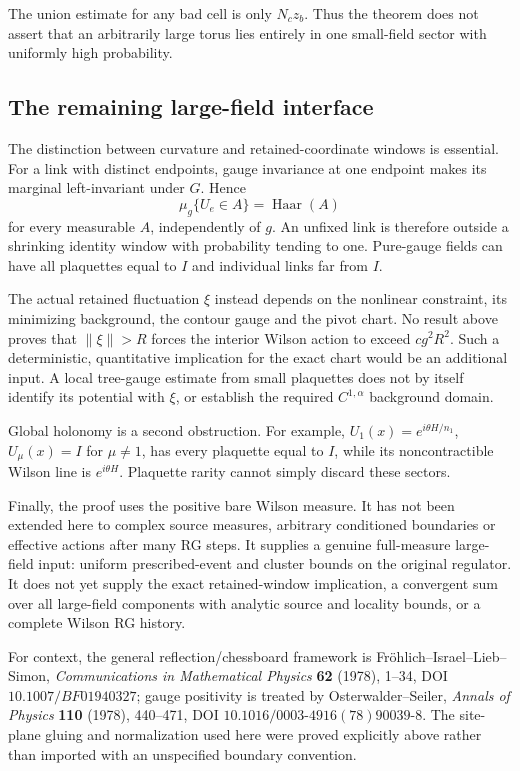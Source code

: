 \documentclass[11pt]{article}
\theoremstyle{remark}
\begin{document}
The union estimate for any bad cell is only \(N_c z_b\).
Thus the theorem does not assert that an arbitrarily large torus lies
entirely in one small-field sector with uniformly high probability.

\subsection{The remaining large-field interface}
\label{fwp-scope}

The distinction between curvature and retained-coordinate windows is
essential. For a link with distinct endpoints, gauge invariance at one
endpoint makes its marginal left-invariant under \(G\). Hence
\begin{equation}
 \mu_g\{U_e\in A\}=\operatorname{Haar}(A)
 \label{fwp-haar-marginal}
\end{equation}
for every measurable \(A\), independently of \(g\).
An unfixed link is therefore outside a shrinking identity window with
probability tending to one. Pure-gauge fields can have all plaquettes
equal to \(I\) and individual links far from \(I\).

The actual retained fluctuation \(\xi\) instead depends on the nonlinear
constraint, its minimizing background, the contour gauge and the pivot
chart. No result above proves that \(\|\xi\|>R\) forces the interior
Wilson action to exceed \(c g^2R^2\). Such a deterministic, quantitative
implication for the exact chart would be an additional input.
A local tree-gauge estimate from small plaquettes does not by itself
identify its potential with \(\xi\), or establish the required
\(C^{1,\alpha}\) background domain.

Global holonomy is a second obstruction. For example,
\(U_1(x)=e^{i\theta H/n_1}\), \(U_\mu(x)=I\) for \(\mu\ne1\),
has every plaquette equal to \(I\), while its noncontractible Wilson
line is \(e^{i\theta H}\). Plaquette rarity cannot simply discard these
sectors.

Finally, the proof uses the positive bare Wilson measure. It has not
been extended here to complex source measures, arbitrary conditioned
boundaries or effective actions after many RG steps. It supplies a
genuine full-measure large-field input: uniform prescribed-event and
cluster bounds on the original regulator. It does not yet supply the
exact retained-window implication, a convergent sum over all large-field
components with analytic source and locality bounds, or a complete
Wilson RG history.

For context, the general reflection/chessboard framework is
Fr\"ohlich--Israel--Lieb--Simon, \emph{Communications in Mathematical
Physics} \textbf{62} (1978), 1--34,
DOI \(10.1007/BF01940327\); gauge positivity is treated by
Osterwalder--Seiler, \emph{Annals of Physics} \textbf{110} (1978),
440--471, DOI \(10.1016/0003\text{-}4916(78)90039\text{-}8\).
The site-plane gluing and normalization used here were proved explicitly
above rather than imported with an unspecified boundary convention.
\end{document}
